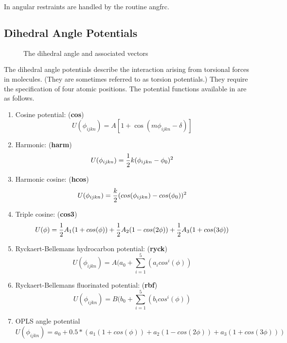 In \D{} angular restraints are handled by the routine {\sc angfrc}.

\subsection{Dihedral Angle Potentials}

\begin{figure}[ht]
\begin{center}
\centerline{}
\caption{The dihedral angle and associated vectors}
\end{center}
\end{figure}

The dihedral angle potentials describe the interaction arising from
torsional forces in molecules. (They are sometimes referred to as
torsion potentials.) They require the specification of four atomic
positions.  The potential functions available in \D{} are as
follows.
\begin{enumerate}
\item Cosine potential: ({\bf cos})
\begin{equation}
U(\phi_{ijkn})= A \left [ 1 + \cos (m\phi_{ijkn} - \delta)\right] 
\end{equation}
\item Harmonic: ({\bf harm})
\begin{equation}
U(\phi_{ijkn})= {1\over 2} k (\phi_{ijkn} - \phi_0)^2 
\end{equation}
\item Harmonic cosine: ({\bf hcos})
\begin{equation}
U(\phi_{ijkn})={k\over 2}(cos(\phi_{ijkn}) -cos(\phi_{0}))^{2}
\end{equation}
\item Triple cosine: ({\bf cos3})
\begin{equation}
U(\phi)={1\over 2}A_{1}(1+cos(\phi))+{1\over 2}A_{2}(1-cos(2\phi))+
{1\over 2}A_{3}(1+cos(3\phi))
\end{equation}
\item Ryckaert-Bellemans hydrocarbon potential: ({\bf ryck})
\begin{equation}
U(\phi_{ijkn})=A(a_0+\sum_{i=1}^{5}(a_i cos^i(\phi))
\end{equation}
\item Ryckaert-Bellemans fluorinated potential: ({\bf rbf})
\begin{equation}
U(\phi_{ijkn})=B(b_0+\sum_{i=1}^{5}(b_i cos^i(\phi))
\end{equation}
\item OPLS angle potential
\begin{equation} 
U(\phi_{ijkn})=a_0+0.5*(a_1(1+cos(\phi))+a_2(1-cos(2\phi))+a_3(1+cos(3\phi)))
\end{equation}

\end{enumerate}
